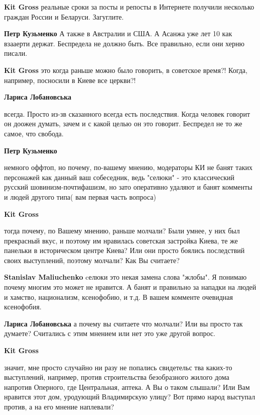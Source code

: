 \begin{itemize}
\begin{itemize}
\begin{itemize}
\textbf{Kit Gross} реальные сроки за посты и репосты в Интернете получили несколько граждан России и Беларуси. Загуглите.

\textbf{Петр Кузьменко} А также в Австралии и США. А Асанжа уже лет 10 как взааерти держат. Беспредела не должно быть. Все правильно, если они херню писали.

\textbf{Kit Gross} это когда раньше можно было говорить, в советское время?! Когда, например, посносили в Киеве все церкви?!

\textbf{Лариса Лобановська} 

всегда. Просто из-зв сказанного всегда есть последствия. Когда человек говорит
он доожен думать, зачем и с какой целью он это говорит. Беспредел не то же
самое, что свобода.

\textbf{Петр Кузьменко} 

немного оффтоп, но почему, по-вашему мнению, модераторы КИ не банят таких
персонажей как данный ваш собеседник, ведь "селюки" - это классический русский
шовинизм-почтифашизм, но зато оперативно удаляют и банят комменты и людей
другого типа( вам первая часть вопроса)

\textbf{Kit Gross} 

тогда почему, по Вашему мнению, раньше молчали? Были умнее, у них был
прекрасный вкус, и поэтому им нравилась советская застройка Киева, те же
панельки в историческом центре Киева? Или они просто боялись последствий своих
выступлений, поэтому молчали? Как Вы считаете?

\textbf{Stanislav Maliuchenko} cелюки это некая замена слова "жлобы". Я понимаю почему многим это может не нравится. А банят и правильно за нападки на людей и хамство, национализм, ксенофобию, и т.д. В вашем комменте очевидная ксенофобия.

\textbf{Лариса Лобановська} а почему вы считаете что молчали? Или вы просто так думаете? Считались с этим мнением или нет это уже другой вопрос.

\textbf{Kit Gross} 

значит, мне просто случайно ни разу не попались свидетельс тва каких-то
выступлений, например, против строительства безобразного жилого дома напротив
Оперного, где Центральная, аптека. А Вы о таком слышали? Или Вам нравится этот
дом, уродующий Владимирскую улицу? Вот прямо народ выступал против, а на его
мнение наплевали?


\end{itemize}
\end{itemize}
\end{itemize}
